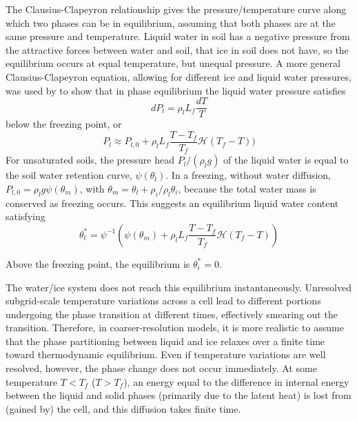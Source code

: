 \documentclass[twoside,10pt]{report}
\begin{document}
The Clausius-Clapeyron relationship gives the pressure/temperature curve along which two phases can be in equilibrium, assuming that both phases are at the same pressure and temperature. Liquid water in soil has a negative pressure from the attractive forces between water and soil, that ice in soil does not have, so the equilibrium occurs at equal temperature, but unequal pressure. A more general Clausius-Clapeyron equation, allowing for different ice and liquid water pressures, was used by \citet{dallamico2011} to show that in phase equilibrium the liquid water pressure satisfies
\begin{equation}
    dP_l = \rho_l L_f \frac{dT}{T}
\end{equation}
below the freezing point, or
\begin{equation}
    P_l \approx P_{l,0} + \rho_l L_f \frac{T-T_f}{T_f}\mathcal{H}(T_f-T))
\end{equation}
For unsaturated soils, the pressure head $P_l/(\rho_l g)$ of the liquid water is equal to the soil water retention curve, $\psi(\theta_l)$. In a freezing, without water diffusion, $P_{l,0} = \rho_l g \psi(\theta_m)$, with $\theta_m = \theta_l+\rho_i/\rho_l\theta_i$, because the total water mass is conserved as freezing occurs. This suggests an equilibrium liquid water content satisfying
\begin{equation}
    \theta_l^* = \psi^{-1}(\psi(\theta_m) + \rho_l L_f \frac{T-T_f}{T_f}\mathcal{H}(T_f-T))
\end{equation}

Above the freezing point, the equilibrium is $\theta_i^* = 0$.

The water/ice system does not reach this equilibrium instantaneously. Unresolved subgrid-scale temperature variations across a cell lead to different portions undergoing the phase transition at different times, effectively smearing out the transition. Therefore, in coarser-resolution models, it is more realistic to assume that the phase partitioning between liquid and ice relaxes over a finite time toward thermodynamic equilibrium. Even if temperature variations are well resolved, however, the phase change does not occur immediately. At some temperature $T<T_f$ ($T>T_f$), an energy equal to the difference in internal energy between the liquid and solid phases (primarily due to the latent heat) is lost from (gained by) the cell, and this diffusion takes finite time. 
\end{document}
